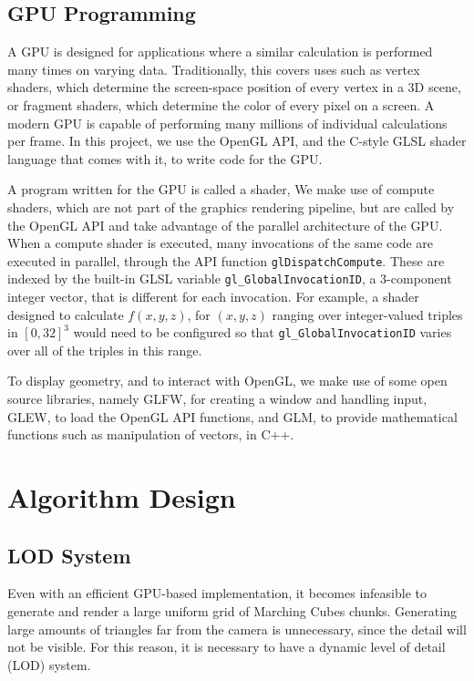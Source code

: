 \documentclass[11pt]{article}
\begin{document}
\subsection{GPU Programming} 
A GPU is designed for applications where a similar calculation is performed many times on varying data. Traditionally, this covers uses such as vertex shaders, which determine the screen-space position of every vertex in a 3D scene, or fragment shaders, which determine the color of every pixel on a screen. A modern GPU is capable of performing many millions of individual calculations per frame. In this project, we use the OpenGL API, and the C-style GLSL shader language that comes with it, to write code for the GPU.

A program written for the GPU is called a shader, We make use of compute shaders, which are not part of the graphics rendering pipeline, but are called by the OpenGL API and take advantage of the parallel architecture of the GPU. When a compute shader is executed, many invocations of the same code are executed in parallel, through the API function \texttt{glDispatchCompute}. These are indexed by the built-in GLSL variable \texttt{gl\_GlobalInvocationID}, a 3-component integer vector, that is different for each invocation. For example, a shader designed to calculate $f\left(x,y,z\right)$, for $ \left(x,y,z\right)$ ranging over integer-valued triples in $\left[0,32\right]^3$ would need to be configured so that \texttt{gl\_GlobalInvocationID} varies over all of the triples in this range.

To display geometry, and to interact with OpenGL, we make use of some open source libraries, namely GLFW\cite{glfw}, for creating a window and handling input, GLEW\cite{glew}, to load the OpenGL API functions, and GLM\cite{g-truc_2005}, to provide mathematical functions such as manipulation of vectors, in C++.


\section{Algorithm Design}

\subsection{LOD System}
Even with an efficient GPU-based implementation, it becomes infeasible to generate and render a large uniform grid of Marching Cubes chunks. Generating large amounts of triangles far from the camera is unnecessary, since the detail will not be visible. For this reason, it is necessary to have a dynamic level of detail (LOD) system.
\end{document}
